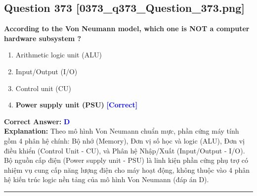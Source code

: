 \documentclass[11pt,a4paper]{article}
\begin{document}
\begin{minipage}{\textwidth}
\subsection*{Question 373 \quad \footnotesize{[0373\_q373\_Question\_373.png]}}
\noindent \textbf{According to the Von Neumann model, which one is NOT a computer hardware subsystem ?}

\begin{enumerate}[label=\Alph*.]
    \item Arithmetic logic unit (ALU)
    \item Input/Output (I/O)
    \item Control unit (CU)
    \item \textbf{Power supply unit (PSU)} \hfill \textcolor{blue}{\textbf{[Correct]}}
\end{enumerate}

\noindent \textbf{Correct Answer:} \textcolor{blue}{\textbf{D}} \\[2pt]
\noindent \textbf{Explanation:} Theo mô hình Von Neumann chuẩn mực, phần cứng máy tính gồm 4 phân hệ chính: Bộ nhớ (Memory), Đơn vị số học và logic (ALU), Đơn vị điều khiển (Control Unit - CU), và Phân hệ Nhập/Xuất (Input/Output - I/O). Bộ nguồn cấp điện (Power supply unit - PSU) là linh kiện phần cứng phụ trợ có nhiệm vụ cung cấp năng lượng điện cho máy hoạt động, không thuộc vào 4 phân hệ kiến trúc logic nền tảng của mô hình Von Neumann (đáp án D).

\par\vspace{0.3cm}
\hrule
\vspace{0.3cm}
\end{minipage}
\end{document}
